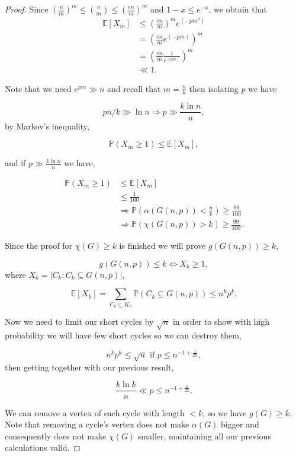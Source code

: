 \documentclass[12pt,twoside,a4paper,bibliography=totocnumbered]{book}
\numberwithin{equation}{section}
\let\log=\ln
\theoremstyle{remark}
\begin{document}
\begin{proof}
Since  $\left(\frac{n}{m}\right)^m \leq \binom{n}{m} \leq \left(\frac{en}{m}\right)^m$ and $1-x \leq e^{-x}$, we obtain that
\begin{align*}
\mathbb{E}[X_m] &\leq \left(\frac{en}{m}\right)^m  e^{(-pm^2)} \\
&= \left(\frac{en}{m} e^{(-pm)}\right)^m\\
&= \left(\frac{en}{m}\frac{1}{e^{(pm)}}\right)^m  \\
&\ll 1.
\end{align*}

Note that we need $e^{pm} \gg n$ and recall that $m =\frac{n}{k}$ then isolating $p$ we have

$$ pn/k \gg \log n \Rightarrow p \gg \frac{k\log n}{n},$$
by Markov's inequality,
 
 $$ \mathbb{P}(X_m \geq 1) \leq \mathbb{E}[X_m] ,$$
 
and if $p \gg \frac{k \log n}{n}$ we have,
 
 \begin{align*}
\mathbb{P}(X_m \geq 1) &\leq \mathbb{E}[X_m] \\
&\leq \frac{1}{100}  \\
&\Rightarrow \mathbb{P}\left(\alpha (G(n,p)) < \frac{n}{k}\right) \geq \frac{99}{100}\\ 
&\Rightarrow  \mathbb{P}\left(\chi(G(n,p)) > k \right) \geq \frac{99}{100}.
\end{align*}

Since the proof for $\chi(G) \geq k$ is finished we will prove $g(G(n,p))\geq k$,

$$ g(G(n,p)) \leq k \iff X_k \geq 1,$$
where $X_k = |C_k \colon C_k \subseteq G(n,p)|$,

$$\mathbb{E}[X_k] = \sum_{C_k \subseteq K_n} \mathbb{P}(C_k \subseteq G(n,p) ) \leq n^kp^k.$$

Now we need to limit our short cycles by $\sqrt{n}$ in order to show with high probability we will have few short cycles so we can destroy them,

$$n^kp^k \leq \sqrt{n} \text{ if } p \leq n^{-1 + \frac{1}{2k}},$$
then getting together with our previous result,

$$\frac{k\log k}{n} \ll p \leq n^{-1 + \frac{1}{2k}}.$$

We can remove a vertex of each cycle with length $<k$, so we have $g(G) \geq k$. Note that removing a cycle's vertex does not make $\alpha(G)$ bigger and consequently does not make $\chi(G)$ smaller, maintaining all our previous calculations valid.
\end{proof}
\end{document}
